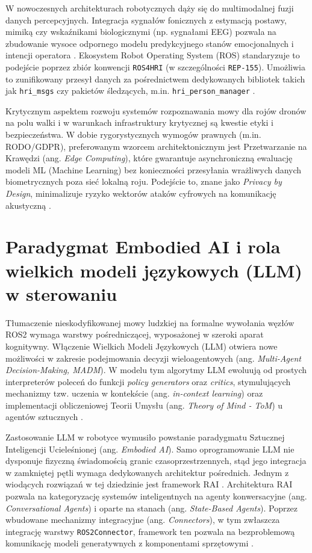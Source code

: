 \documentclass[12pt,a4paper,twoside]{report}
\theoremstyle{definition} %
\begin{document}
W nowoczesnych architekturach robotycznych dąży się do multimodalnej fuzji danych percepcyjnych. Integracja sygnałów fonicznych z estymacją postawy, mimiką czy wskaźnikami biologicznymi (np. sygnałami EEG) pozwala na zbudowanie wysoce odpornego modelu predykcyjnego stanów emocjonalnych i intencji operatora \cite{pomianek2026}. Ekosystem Robot Operating System (ROS) standaryzuje to podejście poprzez zbiór konwencji \texttt{ROS4HRI} (w szczególności \texttt{REP-155}). Umożliwia to zunifikowany przesył danych za pośrednictwem dedykowanych bibliotek takich jak \texttt{hri\_msgs} czy pakietów śledzących, m.in. \texttt{hri\_person\_manager} \cite{pomianek2026}. 

Krytycznym aspektem rozwoju systemów rozpoznawania mowy dla rojów dronów na polu walki i w warunkach infrastruktury krytycznej są kwestie etyki i bezpieczeństwa. W dobie rygorystycznych wymogów prawnych (m.in. RODO/GDPR), preferowanym wzorcem architektonicznym jest Przetwarzanie na Krawędzi (ang. \textit{Edge Computing}), które gwarantuje asynchroniczną ewaluację modeli ML (Machine Learning) bez konieczności przesyłania wrażliwych danych biometrycznych poza sieć lokalną roju. Podejście to, znane jako \textit{Privacy by Design}, minimalizuje ryzyko wektorów ataków cyfrowych na komunikację akustyczną \cite{pomianek2026}.

\section{Paradygmat Embodied AI i rola wielkich modeli językowych (LLM) w sterowaniu}
Tłumaczenie nieskodyfikowanej mowy ludzkiej na formalne wywołania węzłów ROS2 wymaga warstwy pośredniczącej, wyposażonej w szeroki aparat kognitywny. Włączenie Wielkich Modeli Językowych (LLM) otwiera nowe możliwości w zakresie podejmowania decyzji wieloagentowych (ang. \textit{Multi-Agent Decision-Making, MADM}). W modelu tym algorytmy LLM ewoluują od prostych interpreterów poleceń do funkcji \textit{policy generators} oraz \textit{critics}, stymulujących mechanizmy tzw. uczenia w kontekście (ang. \textit{in-context learning}) oraz implementacji obliczeniowej Teorii Umysłu (ang. \textit{Theory of Mind - ToM}) u agentów sztucznych \cite{sun2025}.

Zastosowanie LLM w robotyce wymusiło powstanie paradygmatu Sztucznej Inteligencji Ucieleśnionej (ang. \textit{Embodied AI}). Samo oprogramowanie LLM nie dysponuje fizyczną świadomością granic czasoprzestrzennych, stąd jego integracja w zamkniętej pętli wymaga dedykowanych architektur pośrednich. Jednym z wiodących rozwiązań w tej dziedzinie jest framework RAI \cite{rachwal2025}. Architektura RAI pozwala na kategoryzację systemów inteligentnych na agenty konwersacyjne (ang. \textit{Conversational Agents}) i oparte na stanach (ang. \textit{State-Based Agents}). Poprzez wbudowane mechanizmy integracyjne (ang. \textit{Connectors}), w tym zwłaszcza integrację warstwy \texttt{ROS2Connector}, framework ten pozwala na bezproblemową komunikację modeli generatywnych z komponentami sprzętowymi \cite{rachwal2025}.
\end{document}
